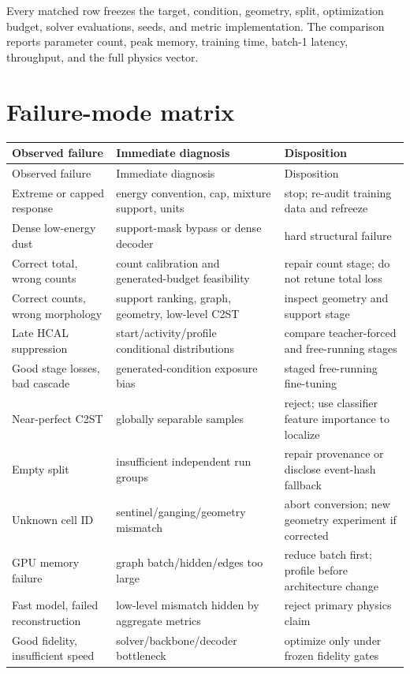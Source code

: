 \documentclass[10pt,a4paper]{article}
\begin{document}
Every matched row freezes the target, condition, geometry, split, optimization budget, solver evaluations, seeds, and metric implementation. The comparison reports parameter count, peak memory, training time, batch-1 latency, throughput, and the full physics vector.

\section{Failure-mode matrix}

\begin{longtable}{@{}p{}p{}p{}@{}}
\toprule
Observed failure & Immediate diagnosis & Disposition \\
\midrule
\endfirsthead
\toprule
Observed failure & Immediate diagnosis & Disposition \\
\midrule
\endhead
Extreme or capped response & energy convention, cap, mixture support, units & stop; re-audit training data and refreeze \\
Dense low-energy dust & support-mask bypass or dense decoder & hard structural failure \\
Correct total, wrong counts & count calibration and generated-budget feasibility & repair count stage; do not retune total loss \\
Correct counts, wrong morphology & support ranking, graph, geometry, low-level C2ST & inspect geometry and support stage \\
Late HCAL suppression & start/activity/profile conditional distributions & compare teacher-forced and free-running stages \\
Good stage losses, bad cascade & generated-condition exposure bias & staged free-running fine-tuning \\
Near-perfect C2ST & globally separable samples & reject; use classifier feature importance to localize \\
Empty split & insufficient independent run groups & repair provenance or disclose event-hash fallback \\
Unknown cell ID & sentinel/ganging/geometry mismatch & abort conversion; new geometry experiment if corrected \\
GPU memory failure & graph batch/hidden/edges too large & reduce batch first; profile before architecture change \\
Fast model, failed reconstruction & low-level mismatch hidden by aggregate metrics & reject primary physics claim \\
Good fidelity, insufficient speed & solver/backbone/decoder bottleneck & optimize only under frozen fidelity gates \\
\bottomrule
\end{longtable}
\end{document}
